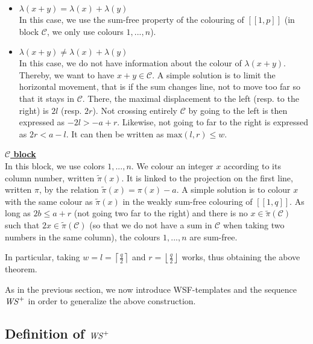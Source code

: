 \begin{itemize}
	\item \underline{\(\lambda(x+y) = \lambda(x) + \lambda(y)\)} \\
	In this case, we use the sum-free property of the colouring of \([\![1,p]\!]\) (in block \(\mathcal{C}\), we only use colours \(1, ..., n\)).

	\item \underline{\(\lambda(x+y) \neq \lambda(x) + \lambda(y)\)} \\
	In this case, we do not have information about the colour of \(\lambda(x+y)\). Thereby, we want to have \(x+y \in \mathcal{C}\).
	A simple solution is to limit the horizontal movement, that is if the sum changes line, not to move too far so that it stays in \(\mathcal{C}\).
	There, the maximal displacement to the left (resp. to the right) is \(2l\) (resp. \(2r\)). Not crossing entirely \(\mathcal{C}\) by going to the left
	is then expressed as \(-2l > -a + r\). Likewise, not going to far to the right is expressed as \(2r < a - l\). It can then be written as
	 \(\text{max}(l, r) \leqslant w\).
\end{itemize}

\underline{\textbf{\(\mathcal{C}\) block}} \\
In this block,  we use colors \(1, ..., n\). We colour an integer \(x\) according to its column number, written \(\tilde{\pi}(x)\). It is linked to the
projection on the first line, written \(\pi\), by the relation \(\tilde{\pi}(x) = \pi(x) - a\). A simple solution is to colour \(x\) with the same colour
as \(\tilde{\pi}(x)\) in the weakly sum-free colouring of \([\![1,q]\!]\). As long as \(2b \leqslant a + r\) (not going two far to the right) and there
is no \(x \in \tilde{\pi}(\mathcal{C})\) such that \(2x \in \tilde{\pi}(\mathcal{C})\) (so that we do not have a sum in \(\mathcal{C}\) when
taking two numbers in the same column), the colours \(1, ..., n\) are sum-free.

In particular, taking \(w = l = \left\lceil \displaystyle \frac{q}{2} \right\rceil\) and \(r = \left\lfloor \displaystyle \frac{q}{2} \right\rfloor\) works, thus obtaining the above theorem.\\
\par
As in the previous section, we now introduce WSF-templates and the sequence \(\mathit{WS}^+\) in order to generalize the above construction.

\subsection{Definition of \(\mathit{WS}^+\)}

